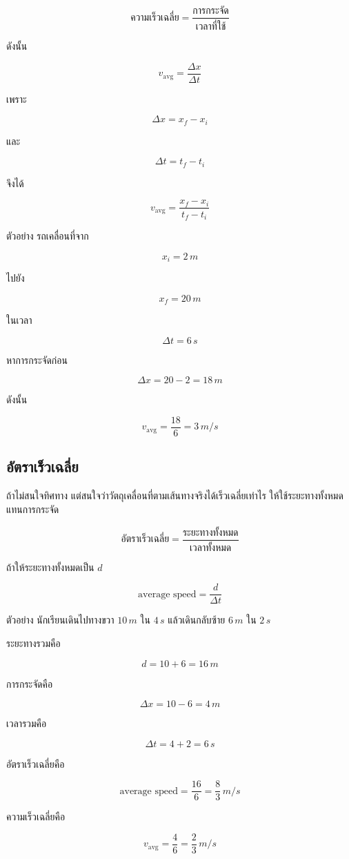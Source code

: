 \[
\text{ความเร็วเฉลี่ย}=\frac{\text{การกระจัด}}{\text{เวลาที่ใช้}}
\]

ดังนั้น

\[
v_{\text{avg}}=\frac{\Delta x}{\Delta t}
\]

เพราะ

\[
\Delta x=x_f-x_i
\]

และ

\[
\Delta t=t_f-t_i
\]

จึงได้

\[
v_{\text{avg}}=\frac{x_f-x_i}{t_f-t_i}
\]

\begin{examplebox}{ตัวอย่าง}
รถเคลื่อนที่จาก

\[
x_i=2\,\si{m}
\]

ไปยัง

\[
x_f=20\,\si{m}
\]

ในเวลา

\[
\Delta t=6\,\si{s}
\]

หาการกระจัดก่อน

\[
\Delta x=20-2=18\,\si{m}
\]

ดังนั้น

\[
v_{\text{avg}}=\frac{18}{6}=3\,\si{m/s}
\]
\end{examplebox}

\subsection{อัตราเร็วเฉลี่ย}

ถ้าไม่สนใจทิศทาง แต่สนใจว่าวัตถุเคลื่อนที่ตามเส้นทางจริงได้เร็วเฉลี่ยเท่าไร ให้ใช้ระยะทางทั้งหมดแทนการกระจัด

\[
\text{อัตราเร็วเฉลี่ย}=\frac{\text{ระยะทางทั้งหมด}}{\text{เวลาทั้งหมด}}
\]

ถ้าให้ระยะทางทั้งหมดเป็น $d$

\[
\text{average speed}=\frac{d}{\Delta t}
\]

\begin{examplebox}{ตัวอย่าง}
นักเรียนเดินไปทางขวา $10\,\si{m}$ ใน $4\,\si{s}$ แล้วเดินกลับซ้าย $6\,\si{m}$ ใน $2\,\si{s}$

ระยะทางรวมคือ

\[
d=10+6=16\,\si{m}
\]

การกระจัดคือ

\[
\Delta x=10-6=4\,\si{m}
\]

เวลารวมคือ

\[
\Delta t=4+2=6\,\si{s}
\]

อัตราเร็วเฉลี่ยคือ

\[
\text{average speed}=\frac{16}{6}=\frac{8}{3}\,\si{m/s}
\]

ความเร็วเฉลี่ยคือ

\[
v_{\text{avg}}=\frac{4}{6}=\frac{2}{3}\,\si{m/s}
\]
\end{examplebox}

